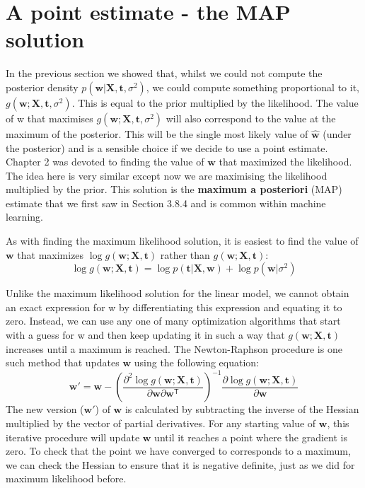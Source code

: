 \section{A point estimate - the MAP solution}

In the previous section we showed that, whilst we could not compute the posterior
density $p(\mathbf{w} | \mathbf{X}, \mathbf{t}, \sigma^2)$,
we could compute something proportional to it,
$g(\mathbf{w}; \mathbf{X}, \mathbf{t}, \sigma^2)$.
This is equal to the prior multiplied by the likelihood. The value of w that maximises
$g(\mathbf{w}; \mathbf{X}, \mathbf{t}, \sigma^2)$
will also correspond to the value at the maximum of the posterior. This
will be the single most likely value of $\widehat{\mathbf{w}}$
(under the posterior) and is a sensible choice
if we decide to use a point estimate. Chapter 2 was devoted to finding the value of
$\mathbf{w}$ that maximized the likelihood.
The idea here is very similar except now we are
maximising the likelihood multiplied by the prior. This solution is the
\textbf{maximum a posteriori} (MAP) estimate that we first saw in
Section 3.8.4 and is common within machine learning.

As with finding the maximum likelihood solution, it is easiest to find the value
of $\mathbf{w}$ that maximizes $\log g(\mathbf{w}; \mathbf{X}, \mathbf{t})$ rather than
$g(\mathbf{w}; \mathbf{X}, \mathbf{t})$:
\begin{equation*}
\log g(\mathbf{w}; \mathbf{X}, \mathbf{t}) =
\log p(\mathbf{t}|\mathbf{X},\mathbf{w}) + \log p(\mathbf{w}|\sigma^2)
\end{equation*}

Unlike the maximum likelihood solution for the linear model, we cannot obtain an
exact expression for w by differentiating this expression and equating it to zero.
Instead, we can use any one of many optimization algorithms that start with a guess
for w and then keep updating it in such a way that
$g(\mathbf{w}; \mathbf{X}, \mathbf{t})$
increases until a maximum is reached.
The Newton-Raphson procedure is one
such method that updates $\mathbf{w}$ using the following equation:
\begin{equation}
\mathbf{w}' = \mathbf{w} - \left(
\frac{\partial^2 \log g(\mathbf{w}; \mathbf{X}, \mathbf{t})}
{\partial \mathbf{w} \partial \mathbf{w}^{\mathsf{T}}}
\right)^{-1}
\frac{\partial \log g(\mathbf{w}; \mathbf{X}, \mathbf{t})}{\partial \mathbf{w}}
\end{equation}
The new version ($\mathbf{w'}$) of $\mathbf{w}$
is calculated by subtracting the inverse of the Hessian
multiplied by the vector of partial derivatives. For any starting
value of $\mathbf{w}$, this iterative procedure will update
$\mathbf{w}$ until it reaches a point where
the gradient is zero. To check that the point we have converged to corresponds to
a maximum, we can check the Hessian to ensure that it is negative definite, just as
we did for maximum likelihood before.

